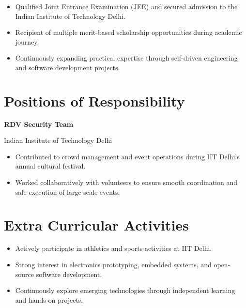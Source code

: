 \documentclass[10pt,a4paper]{article}
\newcommand{\resumeItem}[1]{
\item\small{#1}
}
\begin{document}
\begin{itemize}[leftmargin=*]

\resumeItem{Qualified Joint Entrance Examination (JEE) and secured admission to the Indian Institute of Technology Delhi.}

\resumeItem{Recipient of multiple merit-based scholarship opportunities during academic journey.}

\resumeItem{Continuously expanding practical expertise through self-driven engineering and software development projects.}

\end{itemize}


\section*{Positions of Responsibility}

\textbf{RDV Security Team}

Indian Institute of Technology Delhi

\begin{itemize}[leftmargin=*]

\resumeItem{Contributed to crowd management and event operations during IIT Delhi's annual cultural festival.}

\resumeItem{Worked collaboratively with volunteers to ensure smooth coordination and safe execution of large-scale events.}

\end{itemize}


\section*{Extra Curricular Activities}

\begin{itemize}[leftmargin=*]

\resumeItem{Actively participate in athletics and sports activities at IIT Delhi.}

\resumeItem{Strong interest in electronics prototyping, embedded systems, and open-source software development.}

\resumeItem{Continuously explore emerging technologies through independent learning and hands-on projects.}

\end{itemize}
\end{document}
